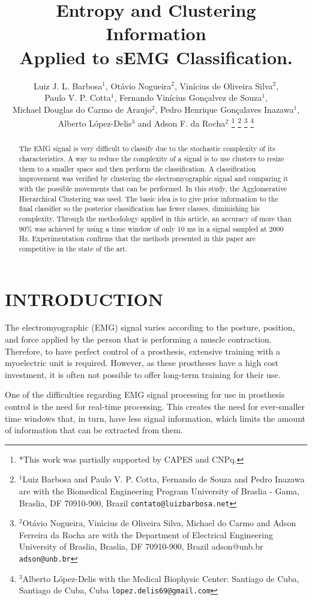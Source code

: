 \documentclass[letterpaper, 10 pt, conference]{ieeeconf}  %
\title{\LARGE \bf
Entropy and Clustering Information\\
Applied to sEMG Classification.
}
\author{Luiz J. L. Barbosa$^{1}$, Otávio Nogueira$^{2}$, Vinícius de Oliveira Silva$^{2}$,\\Paulo V. P. Cotta$^{1}$, Fernando Vinícius Gonçalvez de Souza$^{1}$,\\Michael Douglas do Carmo de Araujo$^{2}$, Pedro Henrique Gonçalaves Inazawa$^{1}$,\\Alberto López-Delis$^{3}$ and Adson F. da Rocha$^{2}$%
\thanks{*This work was partially supported by CAPES and CNPq.}%
\thanks{$^{1}$Luiz Barbosa and Paulo V. P. Cotta, Fernando de Souza and Pedro Inazawa are with the Biomedical Engineering Program University of Braslia - Gama, Braslia, DF 70910-900, Brazil 
        {\tt\small contato@luizbarbosa.net}}%
\thanks{$^{2}$Otávio Nogueira, Vinı́cius de Oliveira Silva, Michael do Carmo and Adson Ferreira da Rocha are with the Department of Electrical Engineering University of Braslia, Braslia, DF 70910-900, Brazil adson@unb.br
        {\tt\small adson@unb.br}}%
\thanks{$^{3}$Alberto López-Delis with the Medical Biophysic Center: Santiago de Cuba, Santiago de Cuba, Cuba
        {\tt\small lopez.delis69@gmail.com}}%
}
\begin{document}
\maketitle
\thispagestyle{empty}
\pagestyle{empty}


\begin{abstract}

The EMG signal is very difficult to classify due to the stochastic complexity of its characteristics. A way to reduce the complexity of a signal is to use clusters to resize them to a smaller space and then perform the classification. A classification improvement was verified by clustering the electromyographic signal and comparing it with the possible movements that can be performed. In this study, the Agglomerative Hierarchical Clustering was used. The basic
idea is to give prior information to the final classifier so the posterior classification has fewer classes, diminishing his complexity. Through the methodology applied in this article, an accuracy of more than 90\% was achieved by using a time window of only 10 ms in a signal sampled at 2000 Hz. Experimentation confirms that the methods presented in this paper are competitive in the state of the art.

%
\end{abstract}



\section{INTRODUCTION}

The electromyographic (EMG) signal varies according to the posture, position, and force applied by the person that is
performing a muscle contraction. Therefore, to have perfect control of a prosthesis, extensive training with a myoelectric unit is required. However, as these prostheses have a high cost investment, it is often not possible to offer long-term training for their use. 

One of the difficulties regarding EMG signal processing for use in prosthesis control is the need for real-time processing. This creates the need for ever-smaller time windows that, in turn, have less signal information, which limits the amount of information that can be extracted from them. 
\end{document}

